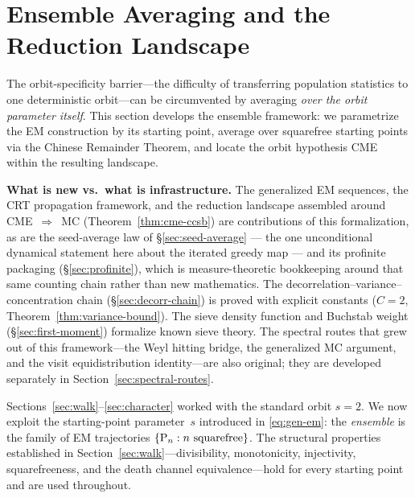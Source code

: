 \section{Ensemble Averaging and the Reduction Landscape}
\label{sec:ensemble}

The orbit-specificity barrier---the difficulty of transferring
population statistics to one deterministic orbit---can be circumvented
by averaging \emph{over the orbit parameter itself}.  This section
develops the ensemble framework: we parametrize the EM construction by
its starting point, average over squarefree starting points via the
Chinese Remainder Theorem, and locate the orbit hypothesis CME within
the resulting landscape.

\medskip\noindent\textbf{What is new vs.\ what is infrastructure.}\enspace
The generalized EM sequences, the CRT propagation framework, and the
reduction landscape assembled around CME~$\Rightarrow$~MC
(Theorem~\ref{thm:cme-ccsb}) are contributions of this
formalization, as are the seed-average law of \S\ref{sec:seed-average} ---
the one unconditional dynamical statement here about the iterated greedy
map --- and its profinite packaging (\S\ref{sec:profinite}), which is
measure-theoretic bookkeeping around that same counting chain rather than
new mathematics.  The decorrelation--variance--concentration
chain (\S\ref{sec:decorr-chain}) is proved with explicit constants
($C = 2$, Theorem~\ref{thm:variance-bound}).  The sieve density function
and Buchstab weight (\S\ref{sec:first-moment}) formalize known sieve
theory.  The spectral routes that grew out of this framework---the
Weyl hitting bridge, the generalized MC argument, and the visit
equidistribution identity---are also original; they are developed
separately in Section~\ref{sec:spectral-routes}.

Sections~\ref{sec:walk}--\ref{sec:character} worked with the standard orbit
$s = 2$.  We now exploit the starting-point parameter~$s$ introduced in
\eqref{eq:gen-em}: the \emph{ensemble} is the family of EM trajectories
$\{\mathrm{P}_{n} : n \text{ squarefree}\}$.  The structural properties
established in Section~\ref{sec:walk}---divisibility, monotonicity,
injectivity, squarefreeness, and the death channel
equivalence---hold for every starting point and are used throughout.

